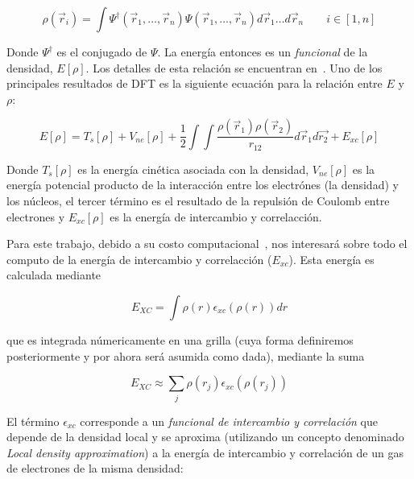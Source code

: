 \begin{equation}
    \label{honenberg_kohn}
    \rho(\vec{r}_i) = \int \Psi^{\dagger}(\vec{r}_1, \dots, \vec{r}_n) \Psi(\vec{r}_1, \dots, \vec{r}_n) d\vec{r}_1 \dots d\vec{r}_n \qquad i \in [1,n]
\end{equation}

Donde $\Psi^{\dagger}$ es el conjugado de $\Psi$. La energ\'ia entonces es un \textit{funcional} de la densidad, $E[\rho]$. Los detalles de esta relaci\'on se encuentran
en~\cite{HohenbergKohn}. Uno de los principales resultados de DFT es la siguiente ecuaci\'on para la relaci\'on entre $E$ y $\rho$:

\begin{equation}
    \label{honenberg_kohn} 
    E[\rho] = T_s[\rho] + V_{ne}[\rho] + \frac{1}{2} \int \int \frac{\rho(\vec{r}_1) \rho(\vec{r}_2)}{r_{12}} d\vec{r}_1 d\vec{r_2} + E_{xc}[\rho]
\end{equation}

Donde $T_s[\rho]$ es la energ\'ia cin\'etica asociada con la densidad, $V_{ne}[\rho]$ es la energ\'ia potencial producto de la interacci\'on entre los
electr\'ones (la densidad) y los n\'ucleos, el tercer t\'ermino es el resultado de la repulsi\'on de Coulomb entre electrones y $E_{xc}[\rho]$ es la
energ\'ia de intercambio y correlacci\'on.

Para este trabajo, debido a su costo computacional~\cite{PaperNitscheManu}, nos interesar\'a sobre todo el computo de la energ\'ia de intercambio y correlacci\'on ($E_{xc}$).
Esta energ\'ia es calculada mediante 

\begin{equation}
    E_{XC} = \int \rho(r) \epsilon_{xc}\left( \rho(r) \right ) dr
\end{equation}

que es integrada n\'umericamente en una grilla (cuya forma definiremos posteriormente y por ahora ser\'a asumida como dada), mediante la suma

\begin{equation}
    \label{approx_excenergy}
    E_{XC} \approx \sum_j \rho(r_j) \epsilon_{xc} (\rho(r_j))
\end{equation}

El t\'ermino $\epsilon_{xc}$ corresponde a un \textit{funcional de intercambio y correlaci\'on} que depende de la densidad local y
se aproxima (utilizando un concepto denominado \textit{Local density approximation}) a la energ\'ia de intercambio y correlaci\'on de 
un gas de electrones de la misma densidad:


